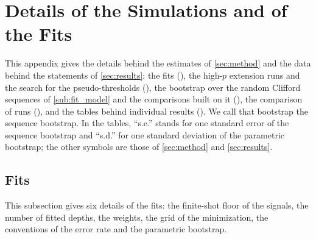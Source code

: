\section{Details of the Simulations and of the Fits}\label{app:campaign}

This appendix gives the details behind the estimates of \autoref{sec:method} and the data behind the statements of \autoref{sec:results}: the fits (), the high-$p$ extension runs and the search for the pseudo-thresholds (), the bootstrap over the random Clifford sequences of \autoref{sub:fit_model} and the comparisons built on it (), the comparison of runs (), and the tables behind individual results (). We call that bootstrap the sequence bootstrap. In the tables, ``s.e.'' stands for one standard error of the sequence bootstrap and ``s.d.'' for one standard deviation of the parametric bootstrap; the other symbols are those of \autoref{sec:method} and \autoref{sec:results}.

\subsection{Fits}
\label{app:campaign-fits}

This subsection gives six details of the fits: the finite-shot floor of the signals, the number of fitted depths, the weights, the grid of the minimization, the conventions of the error rate and the parametric bootstrap.

